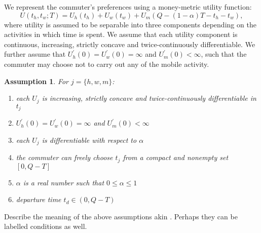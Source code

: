 \documentclass[12pt,a4paper,british]{article}
\newtheorem{assumption}{Assumption}[section]
\begin{document}





We represent the commuter's preferences using a money-metric utility function:%
\begin{equation}
U\left(t_{h},t_{w};T\right)=U_{h}\left(t_{h}\right)+U_{w}\left(t_{w}\right)+U_{m}\left(Q-\left(1-\alpha\right)T-t_{h}-t_{w}\right),
\label{utility0}
\end{equation}
where utility is assumed to be separable into three components depending on the activities in which time is spent. We assume that each utility component is continuous, increasing, strictly concave and twice-continuously differentiable. We further assume that $U_{h}^{\prime}\left(0\right) = U_{w}^{\prime}\left(0\right) = \infty$ and $U_{m}^{\prime}\left(0\right)<\infty$, such that the commuter may choose not to carry out any of the mobile activity.

\begin{assumption}
    For $j=\{h,w,m\}$: 
    \begin{enumerate}
        \item each $U_j$ is increasing, strictly concave and twice-continuously differentiable in $t_j$
        \item $U_{h}^{\prime}\left(0\right) = U_{w}^{\prime}\left(0\right) = \infty$ and $U_{m}^{\prime}\left(0\right)<\infty$
        \item each $U_j$ is differentiable with respect to $\alpha$
        \item the commuter can freely choose $t_j$ from a compact and nonempty set $[0, Q-T]$
        \item $\alpha$ is a real number such that $0 \leq \alpha \leq 1$
        \item departure time $t_d \in (0, Q-T)$
    \end{enumerate}
\end{assumption}

Describe the meaning of the above assumptions akin \citet{FosgerauSmall2017EndogenousSchedulingPreferences}. Perhaps they can be labelled conditions as well.
\end{document}
